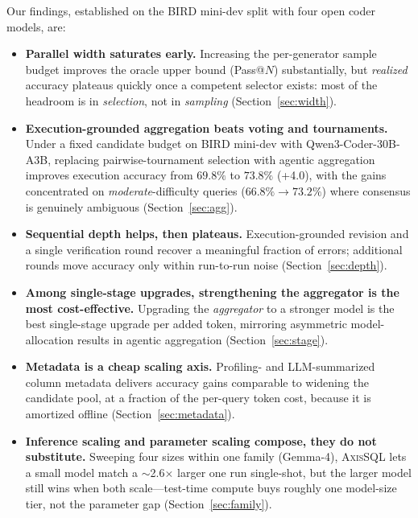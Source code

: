 \documentclass{article}
\newcommand{\sys}{\textsc{AxisSQL}\xspace}
\begin{document}
Our findings, established on the BIRD mini-dev split \citep{minidev2024,li2024bird} with four open coder models, are:

\begin{itemize}
\item \textbf{Parallel width saturates early.} Increasing the per-generator sample budget improves the oracle upper bound (Pass@$N$) substantially, but \emph{realized} accuracy plateaus quickly once a competent selector exists: most of the headroom is in \emph{selection}, not in \emph{sampling} (Section~\ref{sec:width}).
\item \textbf{Execution-grounded aggregation beats voting and tournaments.} Under a fixed candidate budget on BIRD mini-dev with Qwen3-Coder-30B-A3B, replacing pairwise-tournament selection with agentic aggregation improves execution accuracy from $69.8\%$ to $73.8\%$ (+4.0), with the gains concentrated on \emph{moderate}-difficulty queries ($66.8\%\!\rightarrow\!73.2\%$) where consensus is genuinely ambiguous (Section~\ref{sec:agg}).
\item \textbf{Sequential depth helps, then plateaus.} Execution-grounded revision and a single verification round recover a meaningful fraction of errors; additional rounds move accuracy only within run-to-run noise (Section~\ref{sec:depth}).
\item \textbf{Among single-stage upgrades, strengthening the aggregator is the most cost-effective.} Upgrading the \emph{aggregator} to a stronger model is the best single-stage upgrade per added token, mirroring asymmetric model-allocation results in agentic aggregation \citep{lee2026aggagent} (Section~\ref{sec:stage}).
\item \textbf{Metadata is a cheap scaling axis.} Profiling- and LLM-summarized column metadata \citep{shkapenyuk2025metadata} delivers accuracy gains comparable to widening the candidate pool, at a fraction of the per-query token cost, because it is amortized offline (Section~\ref{sec:metadata}).
\item \textbf{Inference scaling and parameter scaling compose, they do not substitute.} Sweeping four sizes within one family (Gemma-4), \sys{} lets a small model match a $\sim$2.6$\times$ larger one run single-shot, but the larger model still wins when both scale---test-time compute buys roughly one model-size tier, not the parameter gap (Section~\ref{sec:family}).
\end{itemize}
\end{document}
